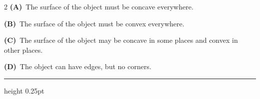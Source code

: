\documentclass[a4paper,10pt,twoside]{article}
\begin{document}
\begin{multicols}{2}
\textbf{(A)}~The surface of the object must be concave everywhere.\par\vspace{2pt}\noindent
\textbf{(B)}~The surface of the object must be convex everywhere.\par\vspace{2pt}\noindent
\textbf{(C)}~The surface of the object may be concave in some places and convex in other places.\par\vspace{2pt}\noindent
\textbf{(D)}~The object can have edges, but no corners.
\par\vspace{6pt}\hrule height 0.25pt\vspace{6pt}

\vspace{6pt}
\vspace{3pt}


\end{multicols}
\end{document}
